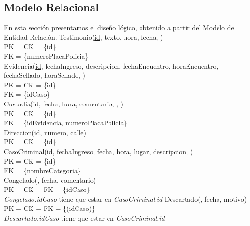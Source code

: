 \documentclass[10pt,a4paper]{article}
\begin{document}
\subsection{Modelo Relacional}
En esta sección presentamos el diseño lógico, obtenido a partir del Modelo de Entidad Relación. 
\newline
\newline
Testimonio(\underline{id}, texto, hora, fecha, )\\
	PK = CK = \{id\}\\ 
	FK = \{numeroPlacaPolicia\}\\ 
\newline
Evidencia(\underline{id}, fechaIngreso, descripcion, fechaEncuentro, horaEncuentro, fechaSellado, horaSellado, )\\ 
	PK = CK = \{id\} \\
	FK = \{idCaso\}\\ 
\newline
Custodia(\underline{id}, fecha, hora, comentario, , )\\ 
	PK = CK = \{id\} \\
	FK = \{idEvidencia, numeroPlacaPolicia\}\\ 
\newline
Direccion(\underline{id}, numero, calle)\\ 
	PK = CK = \{id\}\\ 
\newline
CasoCriminal(\underline{id}, fechaIngreso, fecha, hora, lugar, descripcion, )\\ 
	PK = CK = \{id\}\\ 
	FK = \{nombreCategoria\}\\ 
\newline
Congelado(, fecha, comentario)\\ 
	PK = CK = FK = \{idCaso\}\\ 
\newline
\textit{Congelado.idCaso} tiene que estar en \textit{CasoCriminal.id}
\newline
\newline
Descartado(, fecha, motivo)\\ 
	PK = CK = FK = \{(idCaso)\}\\ 
\newline
\textit{Descartado.idCaso} tiene que estar en \textit{CasoCriminal.id}
\newline
\end{document}
